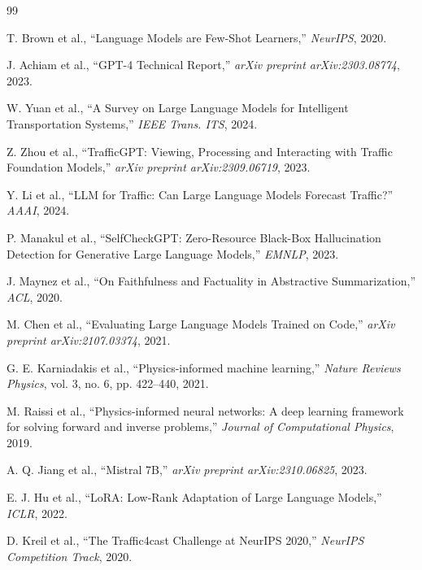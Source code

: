 \documentclass[conference]{IEEEtran}
\begin{document}

\begin{thebibliography}{99}

T. Brown et al., ``Language Models are Few-Shot Learners,'' \emph{NeurIPS}, 2020.

J. Achiam et al., ``GPT-4 Technical Report,'' \emph{arXiv preprint arXiv:2303.08774}, 2023.

W. Yuan et al., ``A Survey on Large Language Models for Intelligent Transportation Systems,'' \emph{IEEE Trans. ITS}, 2024.

Z. Zhou et al., ``TrafficGPT: Viewing, Processing and Interacting with Traffic Foundation Models,'' \emph{arXiv preprint arXiv:2309.06719}, 2023.

Y. Li et al., ``LLM for Traffic: Can Large Language Models Forecast Traffic?'' \emph{AAAI}, 2024.

P. Manakul et al., ``SelfCheckGPT: Zero-Resource Black-Box Hallucination Detection for Generative Large Language Models,'' \emph{EMNLP}, 2023.

J. Maynez et al., ``On Faithfulness and Factuality in Abstractive Summarization,'' \emph{ACL}, 2020.

M. Chen et al., ``Evaluating Large Language Models Trained on Code,'' \emph{arXiv preprint arXiv:2107.03374}, 2021.

G. E. Karniadakis et al., ``Physics-informed machine learning,'' \emph{Nature Reviews Physics}, vol. 3, no. 6, pp. 422--440, 2021.

M. Raissi et al., ``Physics-informed neural networks: A deep learning framework for solving forward and inverse problems,'' \emph{Journal of Computational Physics}, 2019.

A. Q. Jiang et al., ``Mistral 7B,'' \emph{arXiv preprint arXiv:2310.06825}, 2023.

E. J. Hu et al., ``LoRA: Low-Rank Adaptation of Large Language Models,'' \emph{ICLR}, 2022.

D. Kreil et al., ``The Traffic4cast Challenge at NeurIPS 2020,'' \emph{NeurIPS Competition Track}, 2020.

\end{thebibliography}
\end{document}
